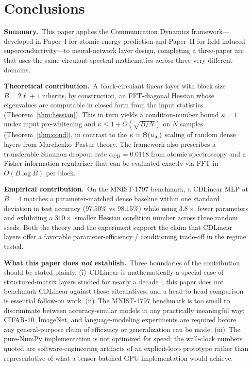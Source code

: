 \documentclass[aps,prx,onecolumn,11pt,nofootinbib,longbibliography]{revtex4-2}
\newcommand{\alphaCD}{\alpha_{\mathrm{CD}}}
\begin{document}
\section{Conclusions}
\label{sec:conc}

\noindent\textbf{Summary.}~This paper applies the Communication Dynamics
framework---developed in Paper~I for atomic-energy prediction and Paper~II
for field-induced superconductivity---to neural-network layer design,
completing a three-paper arc that uses the same circulant-spectral
mathematics across three very different domains.

\smallskip
\noindent\textbf{Theoretical contribution.}~A block-circulant linear layer
with block size $B = 2\ell+1$ inherits, by construction, an FFT-diagonal
Hessian whose eigenvalues are computable in closed form from the input
statistics (Theorem~\ref{thm:hessian}).  This in turn yields a
condition-number bound $\kappa = 1$ under input pre-whitening and
$\kappa \leq 1 + O(\sqrt{B/N})$ on $N$ samples (Theorem~\ref{thm:cond}),
in contrast to the $\kappa = \Theta(n_{\rm in})$ scaling of random dense
layers from Marchenko--Pastur theory.  The framework also prescribes a
transferable Shannon dropout rate $\alphaCD = 0.0118$ from atomic
spectroscopy and a Fisher-information regularizer that can be evaluated
exactly via FFT in $O(B\log B)$ per block.

\smallskip
\noindent\textbf{Empirical contribution.}~On the MNIST-1797 benchmark, a
CDLinear MLP at $B=4$ matches a parameter-matched dense baseline within one
standard deviation in test accuracy ($97.50\%$ vs $98.15\%$) while using
$3.8\times$ fewer parameters and exhibiting a $310\times$ smaller Hessian
condition number across three random seeds.  Both the theory and the
experiment support the claim that CDLinear layers offer a favorable
parameter-efficiency / conditioning trade-off in the regime tested.

\smallskip
\noindent\textbf{What this paper does \emph{not} establish.}~Three boundaries
of the contribution should be stated plainly.  (i)~CDLinear is mathematically
a special case of structured-matrix layers studied for nearly a
decade~\cite{Cheng2015,Sindhwani2015,Moczulski2016,Thomas2018,Dao2022,Li2020};
this paper does not benchmark CDLinear against those alternatives, and a
head-to-head comparison is essential follow-on work.  (ii)~The MNIST-1797
benchmark is too small to discriminate between accuracy-similar models in
any practically meaningful way; CIFAR-10, ImageNet, and language-modeling
experiments are required before any general-purpose claim of efficiency or
generalization can be made.  (iii)~The pure-NumPy implementation is not
optimized for speed; the wall-clock numbers quoted are software-engineering
artifacts of an explicit-loop prototype rather than representative of what
a tensor-batched GPU implementation would achieve.
\end{document}

